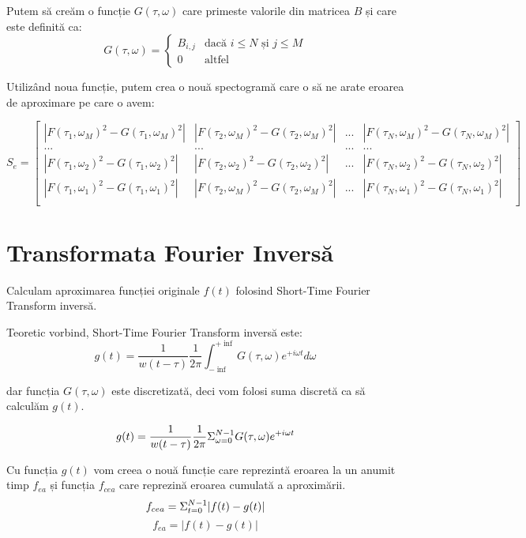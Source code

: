 \documentclass[english]{article}
\begin{document}
Putem să creăm o funcție $G(\tau,\omega)$ care primeste valorile din matricea $B$ și care este definită ca:
\begin{equation}
    G(\tau,\omega) = \begin{cases}
        B_{i,j} & \text{dacă } i \leq N \text{ și } j \leq M \\[6pt]
        0 & \text{altfel}
    \end{cases}
\end{equation}

Utilizând noua funcție, putem crea o nouă spectogramă care o să ne arate eroarea de aproximare pe care o avem:

\begin{equation}
	S_{e} = \begin{bmatrix}
		|F(\tau_{1},\omega_{M})^{2} - G(\tau_{1},\omega_{M})^{2}| & |F(\tau_{2},\omega_{M})^{2} - G(\tau_{2},\omega_{M})^{2}| & ... & |F(\tau_{N},\omega_{M})^{2} - G(\tau_{N},\omega_{M})^{2}| \\
        ... & ... & ... & ... \\
		|F(\tau_{1},\omega_{2})^{2} - G(\tau_{1},\omega_{2})^{2}| & |F(\tau_{2},\omega_{2})^{2} - G(\tau_{2},\omega_{2})^{2}| & ... & |F(\tau_{N},\omega_{2})^{2} - G(\tau_{N},\omega_{2})^{2}| \\
        |F(\tau_{1},\omega_{1})^{2} - G(\tau_{1},\omega_{1})^{2}| & |F(\tau_{2},\omega_{M})^{2} - G(\tau_{2},\omega_{M})^{2}| & ... & |F(\tau_{N},\omega_{1})^{2} - G(\tau_{N},\omega_{1})^{2}| \\
	\end{bmatrix}
\end{equation}

\section{Transformata Fourier Inversă}\label{Modelul}

Calculam aproximarea funcției originale $f(t)$ folosind Short-Time Fourier Transform inversă.

Teoretic vorbind, Short-Time Fourier Transform inversă este:
\begin{equation}
    g(t) = \frac{1}{w(t-\tau)} \frac{1}{2\pi} \int_{-\inf}^{+\inf} G(\tau,\omega) e^{+i\omega t} d\omega
\end{equation}

dar funcția $G(\tau,\omega)$ este discretizată, deci vom folosi suma discretă ca să calculăm $g(t)$.

\begin{equation}
    g(t) = \frac{1}{w(t-\tau)} \frac{1}{2\pi} \Sigma_{\omega=0}^{N-1} G(\tau,\omega) e^{+i\omega t} \\[6pt]
\end{equation}

Cu funcția $g(t)$ vom creea o nouă funcție care reprezintă eroarea la un anumit timp $f_{ea}$ și funcția $f_{cea}$ care reprezină eroarea cumulată a aproximării.
\begin{equation}
    f_{cea} = \Sigma_{t=0}^{N-1} |f(t) - g(t)| \\[4pt]
\end{equation}
\begin{equation}
    f_{ea} = |f(t) - g(t)|
\end{equation}
\end{document}

